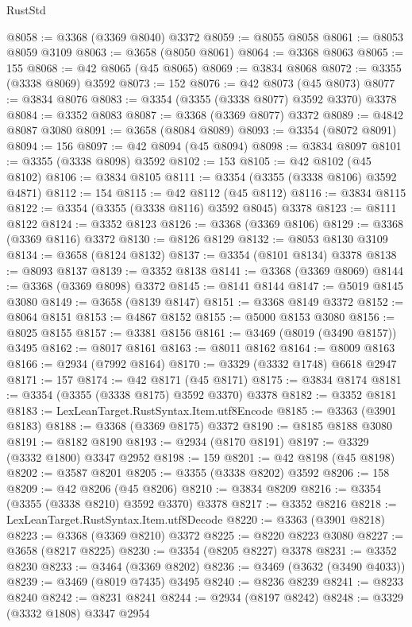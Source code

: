 \begin{lexlean}{RustStd}
\begin{coremodule}
@8058 := @3368 (@3369 @8040) @3372
@8059 := @8055 @8058
@8061 := @8053 @8059 @3109
@8063 := @3658 (@8050 @8061)
@8064 := @3368 @8063
@8065 := 155
@8068 := @42 @8065 (@45 @8065)
@8069 := @3834 @8068
@8072 := @3355 (@3338 @8069) @3592
@8073 := 152
@8076 := @42 @8073 (@45 @8073)
@8077 := @3834 @8076
@8083 := @3354 (@3355 (@3338 @8077) @3592 @3370) @3378
@8084 := @3352 @8083
@8087 := @3368 (@3369 @8077) @3372
@8089 := @4842 @8087 @3080
@8091 := @3658 (@8084 @8089)
@8093 := @3354 (@8072 @8091)
@8094 := 156
@8097 := @42 @8094 (@45 @8094)
@8098 := @3834 @8097
@8101 := @3355 (@3338 @8098) @3592
@8102 := 153
@8105 := @42 @8102 (@45 @8102)
@8106 := @3834 @8105
@8111 := @3354 (@3355 (@3338 @8106) @3592 @4871)
@8112 := 154
@8115 := @42 @8112 (@45 @8112)
@8116 := @3834 @8115
@8122 := @3354 (@3355 (@3338 @8116) @3592 @8045) @3378
@8123 := @8111 @8122
@8124 := @3352 @8123
@8126 := @3368 (@3369 @8106)
@8129 := @3368 (@3369 @8116) @3372
@8130 := @8126 @8129
@8132 := @8053 @8130 @3109
@8134 := @3658 (@8124 @8132)
@8137 := @3354 (@8101 @8134) @3378
@8138 := @8093 @8137
@8139 := @3352 @8138
@8141 := @3368 (@3369 @8069)
@8144 := @3368 (@3369 @8098) @3372
@8145 := @8141 @8144
@8147 := @5019 @8145 @3080
@8149 := @3658 (@8139 @8147)
@8151 := @3368 @8149 @3372
@8152 := @8064 @8151
@8153 := @4867 @8152
@8155 := @5000 @8153 @3080
@8156 := @8025 @8155
@8157 := @3381 @8156
@8161 := @3469 (@8019 (@3490 @8157)) @3495
@8162 := @8017 @8161
@8163 := @8011 @8162
@8164 := @8009 @8163
@8166 := @2934 (@7992 @8164)
@8170 := @3329 (@3332 @1748) @6618 @2947
@8171 := 157
@8174 := @42 @8171 (@45 @8171)
@8175 := @3834 @8174
@8181 := @3354 (@3355 (@3338 @8175) @3592 @3370) @3378
@8182 := @3352 @8181
@8183 := LexLeanTarget.RustSyntax.Item.utf8Encode
@8185 := @3363 (@3901 @8183)
@8188 := @3368 (@3369 @8175) @3372
@8190 := @8185 @8188 @3080
@8191 := @8182 @8190
@8193 := @2934 (@8170 @8191)
@8197 := @3329 (@3332 @1800) @3347 @2952
@8198 := 159
@8201 := @42 @8198 (@45 @8198)
@8202 := @3587 @8201
@8205 := @3355 (@3338 @8202) @3592
@8206 := 158
@8209 := @42 @8206 (@45 @8206)
@8210 := @3834 @8209
@8216 := @3354 (@3355 (@3338 @8210) @3592 @3370) @3378
@8217 := @3352 @8216
@8218 := LexLeanTarget.RustSyntax.Item.utf8Decode
@8220 := @3363 (@3901 @8218)
@8223 := @3368 (@3369 @8210) @3372
@8225 := @8220 @8223 @3080
@8227 := @3658 (@8217 @8225)
@8230 := @3354 (@8205 @8227) @3378
@8231 := @3352 @8230
@8233 := @3464 (@3369 @8202)
@8236 := @3469 (@3632 (@3490 @4033))
@8239 := @3469 (@8019 @7435) @3495
@8240 := @8236 @8239
@8241 := @8233 @8240
@8242 := @8231 @8241
@8244 := @2934 (@8197 @8242)
@8248 := @3329 (@3332 @1808) @3347 @2954

\end{coremodule}
\end{lexlean}
